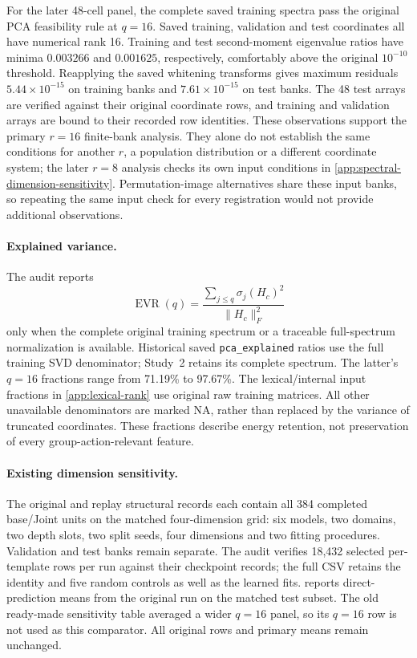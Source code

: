 For the later 48-cell panel, the complete saved training spectra pass the original PCA feasibility rule at $q=16$. Saved training, validation and test coordinates all have numerical rank 16. Training and test second-moment eigenvalue ratios have minima $0.003266$ and $0.001625$, respectively, comfortably above the original $10^{-10}$ threshold. Reapplying the saved whitening transforms gives maximum residuals $5.44\times10^{-15}$ on training banks and $7.61\times10^{-15}$ on test banks. The 48 test arrays are verified against their original coordinate rows, and training and validation arrays are bound to their recorded row identities. These observations support the primary $r=16$ finite-bank analysis. They alone do not establish the same conditions for another $r$, a population distribution or a different coordinate system; the later $r=8$ analysis checks its own input conditions in \cref{app:spectral-dimension-sensitivity}. Permutation-image alternatives share these input banks, so repeating the same input check for every registration would not provide additional observations.

\paragraph{Explained variance.}
The audit reports
\[
 \operatorname{EVR}(q)=\frac{\sum_{j\le q}\sigma_j(H_c)^2}{\|H_c\|_F^2}
\]
only when the complete original training spectrum or a traceable full-spectrum normalization is available. Historical saved \texttt{pca\_explained} ratios use the full training SVD denominator; Study~2 retains its complete spectrum. The latter's $q=16$ fractions range from 71.19\% to 97.67\%. The lexical/internal input fractions in \cref{app:lexical-rank} use original raw training matrices. All other unavailable denominators are marked NA, rather than replaced by the variance of truncated coordinates. These fractions describe energy retention, not preservation of every group-action-relevant feature.

\paragraph{Existing dimension sensitivity.}
The original and replay structural records each contain all 384 completed base/Joint units on the matched four-dimension grid: six models, two domains, two depth slots, two split seeds, four dimensions and two fitting procedures. Validation and test banks remain separate. The audit verifies 18,432 selected per-template rows per run against their checkpoint records; the full CSV retains the identity and five random controls as well as the learned fits.  reports direct-prediction means from the original run on the matched test subset. The old ready-made sensitivity table averaged a wider $q=16$ panel, so its $q=16$ row is not used as this comparator. All original rows and primary means remain unchanged.

